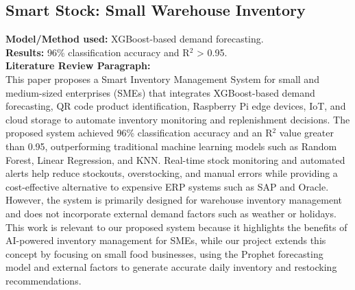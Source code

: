 \documentclass[conference]{IEEEtran}
\begin{document}
\subsection{Smart Stock: Small Warehouse Inventory}
\textbf{Model/Method used:} XGBoost-based demand forecasting.\\
\textbf{Results:} 96\% classification accuracy and R$^2$ > 0.95.\\
\textbf{Literature Review Paragraph:}\\
This paper proposes a Smart Inventory Management System for small and medium-sized enterprises (SMEs) that integrates XGBoost-based demand forecasting, QR code product identification, Raspberry Pi edge devices, IoT, and cloud storage to automate inventory monitoring and replenishment decisions. The proposed system achieved 96\% classification accuracy and an R$^2$ value greater than 0.95, outperforming traditional machine learning models such as Random Forest, Linear Regression, and KNN. Real-time stock monitoring and automated alerts help reduce stockouts, overstocking, and manual errors while providing a cost-effective alternative to expensive ERP systems such as SAP and Oracle. However, the system is primarily designed for warehouse inventory management and does not incorporate external demand factors such as weather or holidays. This work is relevant to our proposed system because it highlights the benefits of AI-powered inventory management for SMEs, while our project extends this concept by focusing on small food businesses, using the Prophet forecasting model and external factors to generate accurate daily inventory and restocking recommendations.
\end{document}
